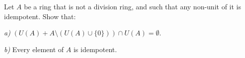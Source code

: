 Let $ A $ be a ring that is not a division ring, and such that any non-unit of it is idempotent. Show that:

\textit{a)} $ \left( U(A) +A\setminus\left( U(A)\cup \{ 0\} \right) \right)\cap U(A) =\emptyset . $

\textit{b)} Every element of $ A $ is idempotent.